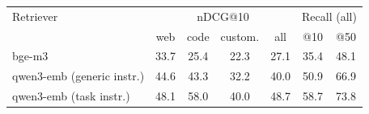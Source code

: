 \begin{tabular}{lcccc|cc}
\toprule
Retriever & \multicolumn{4}{c|}{nDCG@10} & \multicolumn{2}{c}{Recall (all)} \\
 & web & code & custom. & all & @10 & @50 \\
\midrule
bge-m3 & 33.7 & 25.4 & 22.3 & 27.1 & 35.4 & 48.1 \\
qwen3-emb (generic instr.) & 44.6 & 43.3 & 32.2 & 40.0 & 50.9 & 66.9 \\
qwen3-emb (task instr.) & 48.1 & 58.0 & 40.0 & 48.7 & 58.7 & 73.8 \\
\bottomrule
\end{tabular}